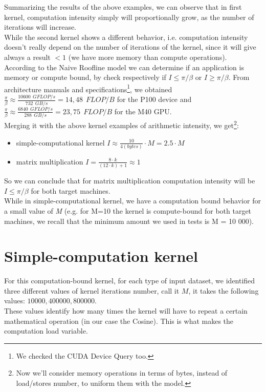 	Summarizing the results of the above examples, we can observe that in first kernel, computation intensity simply will proportionally grow, as the number of iterations will increase.\\
	While the second kernel shows a different behavior, i.e. computation intensity doesn't really depend on the number of iterations of the kernel, since it will give always a result \(< 1\) (we have more memory than compute operations).\\
	According to the Naive Roofline model we can determine if an application is memory or compute bound, by check respectively if \(I \leq \pi / \beta \) or \(I \geq \pi / \beta \).
	From architecture manuals\cite{p100whitepaper} and specifications\footnote{We checked the CUDA Device Query too.}, we obtained \( \frac{\pi}{\beta} \approx \frac{10600 \ \  GFLOP/s}{732 \ \ GB/s} = 14,48 \ \ FLOP/B \) for the P100 device and \( \frac{\pi}{\beta} \approx \frac{6840 \ \ GFLOP/s}{288 \ \ GB/s} = 23,75 \ \ FLOP/B \) for the M40 GPU.\\
	Merging it with the above kernel examples of arithmetic intensity, we get\footnote{Now we'll consider memory operations in terms of bytes, instead of load/stores number, to uniform them with the model.}:
	\begin{itemize}
		\item simple-computational kernel \(I \approx \frac{10}{4 (bytes)} \cdot M = 2.5 \cdot M \)
		\item matrix multiplication \(I = \frac{8 \cdot k}{(12 \cdot k)+1} \approx 1 \)
	\end{itemize}
	So we can conclude that for matrix multiplication computation intensity will be \(I \leq \pi / \beta \) for both target machines.\\
	While in simple-computational kernel, we have a computation bound behavior for a small value of \textit{M} (e.g. for M=10 the kernel is compute-bound for both target machines, we recall that the minimum amount we used in tests is M = 10 000).
	
	
\section{Simple-computation kernel}
For this computation-bound kernel, for each type of input dataset, we identified three different values of kernel iterations number, call it \(M\), it takes the following values: \(10 000, 400 000, 800 000\).\\
These values identify how many times the kernel will have to repeat a certain mathematical operation (in our case the Cosine). This is what makes the computation load variable.

